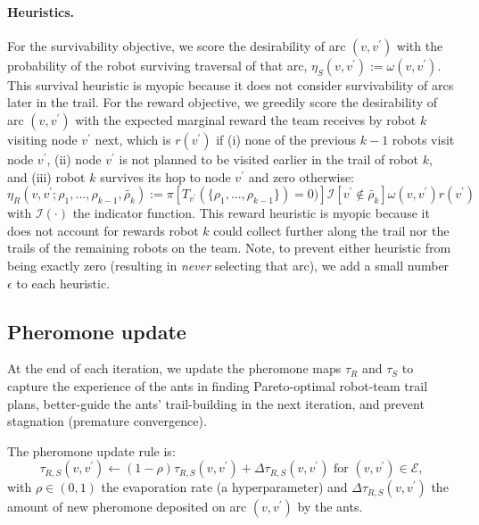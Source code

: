 \documentclass[fleqn,10pt,lineno]{wlpeerj}
\begin{document}
\paragraph{Heuristics.} 
For the survivability objective, we score the desirability of arc $(v, v^\prime)$ with the probability of the robot surviving traversal of that arc, $\eta_S(v, v^\prime):=\omega(v, v^\prime)$. This survival heuristic is myopic because it does not consider survivability of arcs later in the trail. 
For the reward objective, we greedily score the desirability of arc $(v, v^\prime)$ with the expected marginal reward the team receives by robot $k$ visiting node $v^\prime$ next, which is $r(v^\prime)$ if 
(i) none of the previous $k-1$ robots visit node $v^\prime$, 
(ii) node $v^\prime$ is not planned to be visited earlier in the trail of robot $k$, and
(iii) robot $k$ survives its hop to node $v^\prime$
and zero otherwise:
\begin{equation}
	\eta_R(v, v^\prime; \rho_1, ..., \rho_{k-1}, \tilde{\rho_k}) :=  
	 \pi[ T_{v^\prime}(\{\rho_1, ..., \rho_{k-1}\}) = 0)] \mathcal{I}[v^\prime \notin \tilde{\rho_k}] \omega(v, v^\prime) r(v^\prime ) \label{eq:eta_R}
\end{equation}
with $\mathcal{I}(\cdot)$ the indicator function. This reward heuristic is myopic because it does not account for rewards robot $k$ could collect further along the trail nor the trails of the remaining robots on the team. 
Note, to prevent either heuristic from being exactly zero (resulting in \emph{never} selecting that arc), we add a small number $\epsilon$ to each heuristic.


\subsection{Pheromone update}
At the end of each iteration, we update the pheromone maps $\tau_R$ and $\tau_S$ to capture the experience of the ants in finding Pareto-optimal robot-team trail plans, better-guide the ants' trail-building in the next iteration, and prevent stagnation (premature convergence). 


The pheromone update rule is:
\begin{equation}
	\tau_{R, S}(v, v^\prime) \leftarrow (1-\rho) \tau_{R,S}(v, v^\prime)  + \Delta \tau_{R,S}(v, v^\prime) \text{ for } (v, v^\prime) \in \mathcal{E}, \label{eq:tau_update}
\end{equation}
with $\rho \in (0, 1)$ the evaporation rate (a hyperparameter) and $\Delta \tau_{R,S}(v, v^\prime)$ the amount of new pheromone deposited on arc $(v, v^\prime)$ by the ants.
\end{document}
